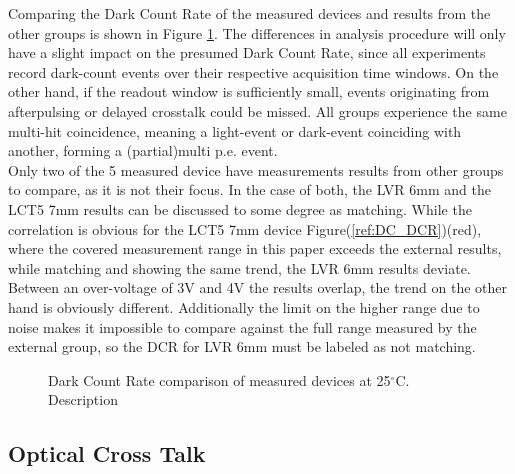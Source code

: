 \documentclass[12pt,article,type=msc,colorback,accentcolor=tud9c]{tudthesis}
\begin{document}
Comparing the Dark Count Rate of the measured devices and results from the other groups is shown in Figure \ref{fig:DC_DCR}. The differences in analysis procedure will only have a slight impact on the presumed Dark Count Rate, since all experiments record dark-count events over their respective acquisition time windows. On the other hand, if the readout window is sufficiently small, events originating from afterpulsing or delayed crosstalk could be missed. All groups experience the same multi-hit coincidence, meaning a light-event or dark-event coinciding with another, forming a (partial)multi p.e. event.\\
Only two of the 5 measured device have measurements results from other groups to compare, as it is not their focus. In the case of both, the LVR 6mm and the LCT5 7mm results can be discussed to some degree as matching. While the correlation is obvious for the LCT5 7mm device Figure(\ref{ref:DC_DCR})(red), where the covered measurement range in this paper exceeds the  external results, while matching and showing the same trend, the LVR 6mm results deviate. Between an over-voltage of 3V and 4V the results overlap, the trend on the other hand is obviously different. Additionally the limit on the higher range due to noise makes it impossible to compare against the full range measured by the external group, so the DCR for LVR 6mm must be labeled as not matching. 

\begin{figure}%
\begin{centering}
\caption{Dark Count Rate comparison of measured devices at 25$^\circ$C. Description}
\label{fig:DC_DCR}
\end{centering}
\end{figure}

\subsection{Optical Cross Talk}
\label{subsec:DC_OCT}
\end{document}
